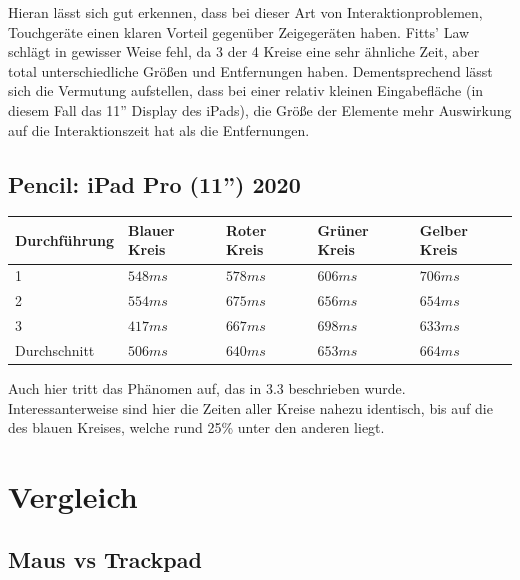 \documentclass{article}
\begin{document}
\vspace{0.5em}

Hieran lässt sich gut erkennen, dass bei dieser Art von Interaktionproblemen,
Touchgeräte einen klaren Vorteil gegenüber Zeigegeräten haben. Fitts' Law
schlägt in gewisser Weise fehl, da 3 der 4 Kreise eine sehr ähnliche Zeit,
aber total unterschiedliche Größen und Entfernungen haben. Dementsprechend
lässt sich die Vermutung aufstellen, dass bei einer relativ kleinen
Eingabefläche (in diesem Fall das 11'' Display des iPads), die Größe der
Elemente mehr Auswirkung auf die Interaktionszeit hat als die Entfernungen.

\subsection{Pencil: iPad Pro (11'') 2020}

\vspace{0.5em}

\begin{tabularx}{\textwidth}{|X|X|X|X|X|}
	\hline
	Durchführung & Blauer Kreis & Roter Kreis & Grüner Kreis & Gelber Kreis \\
	\hline
	1            & $548ms$      & $578ms$     & $606ms$      & $706ms$      \\
	\hline
	2            & $554ms$      & $675ms$     & $656ms$      & $654ms$      \\
	\hline
	3            & $417ms$      & $667ms$     & $698ms$      & $633ms$      \\
	\hline
	\hline
	Durchschnitt & $506ms$      & $640ms$     & $653ms$      & $664ms$      \\
	\hline
\end{tabularx}

\vspace{0.5em}

Auch hier tritt das Phänomen auf, das in 3.3 beschrieben wurde.
Interessanterweise sind hier die Zeiten aller Kreise nahezu identisch, bis auf
die des blauen Kreises, welche rund 25\% unter den anderen liegt.

\section{Vergleich}

\subsection{Maus vs Trackpad}
\end{document}
